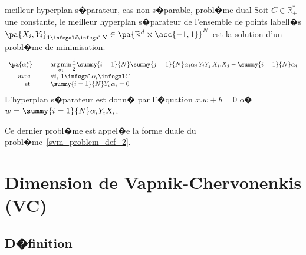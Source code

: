             \begin{xproblem}{meilleur hyperplan s�parateur, cas non s�parable, probl�me dual}
            \label{svm_problem_def_2p}
            Soit $C \in \mathbb{R}^*_+$ une constante,
            le meilleur hyperplan s�parateur de l'ensemble de points labell�s
            $\pa{X_i,Y_i}_{1 \infegal i \infegal N} \in \pa{ \mathbb{R}^d \times \acc{-1,1} }^N$ est la solution
            d'un probl�me de minimisation. 
                    $$
                    \begin{array}{rcl}    \pa{\alpha_i^*} &=& \underset{\alpha_i}{\arg \min} \dfrac{1}{2}  
                                                                                    \summy{i=1}{N}\summy{j=1}{N}
                                                                                            \alpha_i \alpha_j \,
                                                                                            Y_i Y_j \,
                                                                                            X_i . X_j
                                                                                    - \summy{i=1}{N} \alpha_i \\
                                         \text{avec }      && \forall i, \; 1 \infegal \alpha_i \infegal C \\
                                         \text{et }          && \summy{i=1}{N} Y_i \, \alpha_i = 0
                    \end{array}                                        
                    $$
            L'hyperplan s�parateur est donn� par l'�quation $ x.w + b = 0$ o� 
            $w = \summy{i=1}{N} \alpha_i Y_i X_i$.
            \end{xproblem}

Ce dernier probl�me est appel�e la forme duale du probl�me~\ref{svm_problem_def_2}.

\section{Dimension de Vapnik-Chervonenkis (VC)}
\label{svm_dimension_vc}



\subsection{D�finition}

